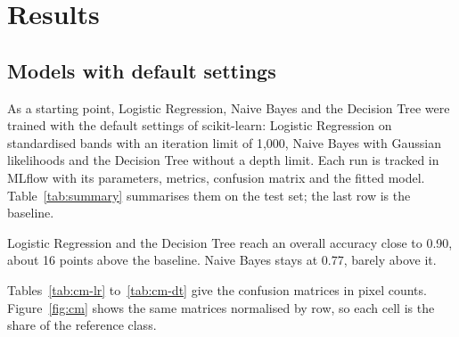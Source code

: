 \documentclass[11pt,a4paper]{article}
\begin{document}
\section{Results}

\subsection{Models with default settings}

As a starting point, Logistic Regression, Naive Bayes and the Decision Tree
were trained with the default settings of scikit-learn: Logistic Regression
on standardised bands with an iteration limit of 1,000, Naive Bayes with
Gaussian likelihoods and the Decision Tree without a depth limit. Each run is
tracked in MLflow with its parameters, metrics, confusion matrix and the
fitted model. Table~\ref{tab:summary} summarises them on the test set; the
last row is the baseline.

\begin{table}[H]
\centering\small
\caption{Models with default settings on the test set (114,846 pixels).}
\label{tab:summary}

\end{table}

Logistic Regression and the Decision Tree reach an overall accuracy close to
0.90, about 16 points above the baseline. Naive Bayes stays at 0.77, barely
above it.

Tables~\ref{tab:cm-lr} to~\ref{tab:cm-dt} give the confusion matrices in
pixel counts. Figure~\ref{fig:cm} shows the same matrices normalised by row,
so each cell is the share of the reference class.

\begin{table}[H]
\centering\footnotesize
\caption{Confusion matrix of Logistic Regression with default settings
(overall accuracy 0.9069).}
\label{tab:cm-lr}

\end{table}

\begin{table}[H]
\centering\footnotesize
\caption{Confusion matrix of Naive Bayes with default settings (overall
accuracy 0.7675).}
\label{tab:cm-nb}

\end{table}

\begin{table}[H]
\centering\footnotesize
\caption{Confusion matrix of the Decision Tree with default settings (overall
accuracy 0.8996).}
\label{tab:cm-dt}

\end{table}
\end{document}
